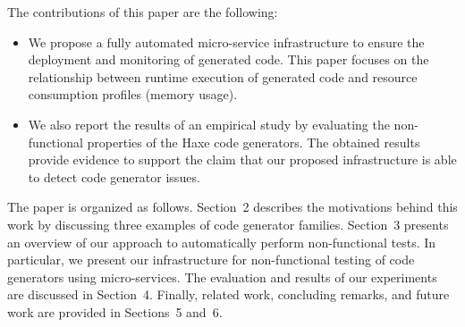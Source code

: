 The contributions of this paper are the following:
\begin{itemize} 	
		\setlength\itemsep{0em}
			
	\item We propose a fully automated micro-service infrastructure to ensure the deployment and monitoring of generated code. This paper focuses on the relationship between runtime execution of generated code and resource consumption profiles (memory usage).
	\item We also report the results of an empirical study by evaluating the non-functional properties of the Haxe code generators. 
	The obtained results provide evidence to support the claim that our proposed infrastructure is able to detect code generator issues.
\end{itemize}

The paper is organized as follows.
Section~2 describes the motivations behind this work by discussing three examples of code generator families. 
Section~3 presents an overview of our approach to automatically perform non-functional tests. In particular, we present our infrastructure for non-functional testing of code generators using micro-services. 
The evaluation and results of our experiments are discussed in Section~4. 
Finally, related work, concluding remarks, and future work are provided in Sections~5 and~6.

